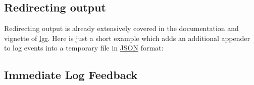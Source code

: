 \documentclass[
]{scrbook}
\newenvironment{Shaded}{\begin{snugshade}}{\end{snugshade}}
\newcommand{\AttributeTok}[1]{\textcolor[rgb]{0.77,0.63,0.00}{#1}}
\newcommand{\CommentTok}[1]{\textcolor[rgb]{0.56,0.35,0.01}{\textit{#1}}}
\newcommand{\FunctionTok}[1]{\textcolor[rgb]{0.00,0.00,0.00}{#1}}
\newcommand{\NormalTok}[1]{#1}
\newcommand{\OtherTok}[1]{\textcolor[rgb]{0.56,0.35,0.01}{#1}}
\newcommand{\SpecialCharTok}[1]{\textcolor[rgb]{0.00,0.00,0.00}{#1}}
\newcommand{\StringTok}[1]{\textcolor[rgb]{0.31,0.60,0.02}{#1}}
\renewenvironment{Shaded} {\begin{snugshade}\small} {\end{snugshade}}
\begin{document}
\hypertarget{redirecting-output}{%
\subsection{Redirecting output}\label{redirecting-output}}

Redirecting output is already extensively covered in the documentation and vignette of \href{https://cran.r-project.org/package=lgr}{lgr}.
Here is just a short example which adds an additional appender to log events into a temporary file in \href{https://en.wikipedia.org/wiki/JSON}{JSON} format:

\begin{Shaded}
\end{Shaded}

\hypertarget{immediate-log-feedback}{%
\subsection{Immediate Log Feedback}\label{immediate-log-feedback}}
\end{document}
